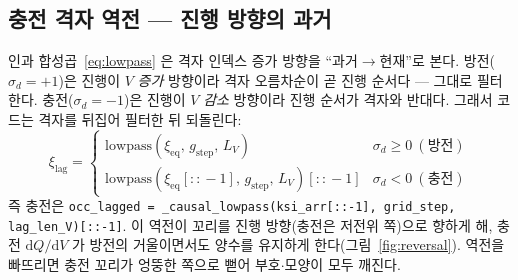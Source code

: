 \documentclass[11pt,a4paper]{article}
\newcommand{\dd}{\mathrm{d}}
\newcommand{\eq}{\mathrm{eq}}
\newcommand{\lag}{\mathrm{lag}}
\newcommand{\code}[1]{\texttt{#1}}
\begin{document}
\subsection{충전 격자 역전 — 진행 방향의 과거}
인과 합성곱~\eqref{eq:lowpass} 은 격자 인덱스 증가 방향을 ``과거$\to$현재''로 본다. 방전($\sigma_d=+1$)은 진행이 $V$ \emph{증가} 방향이라 격자 오름차순이 곧 진행 순서다 — 그대로 필터한다. 충전($\sigma_d=-1$)은 진행이 $V$ \emph{감소} 방향이라 진행 순서가 격자와 반대다. 그래서 코드는 격자를 뒤집어 필터한 뒤 되돌린다:
\begin{equation}
\boxed{\;\xi_\lag=\begin{cases}
\mathrm{lowpass}(\xi_\eq,\,g_\mathrm{step},\,L_V) & \sigma_d\ge0\ (\text{방전})\\[2pt]
\mathrm{lowpass}(\xi_\eq[::\!-\!1],\,g_\mathrm{step},\,L_V)[::\!-\!1] & \sigma_d<0\ (\text{충전})
\end{cases}\;}
\label{eq:reversal}
\end{equation}
즉 충전은 \code{occ\_lagged = \_causal\_lowpass(ksi\_arr[::-1], grid\_step, lag\_len\_V)[::-1]}. 이 역전이 꼬리를 진행 방향(충전은 저전위 쪽)으로 향하게 해, 충전 $\dd Q/\dd V$ 가 방전의 거울이면서도 양수를 유지하게 한다(그림~\ref{fig:reversal}). 역전을 빠뜨리면 충전 꼬리가 엉뚱한 쪽으로 뻗어 부호$\cdot$모양이 모두 깨진다.
\end{document}
